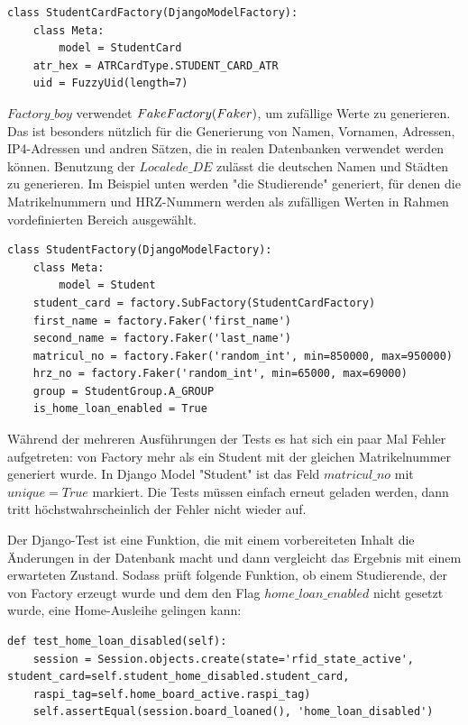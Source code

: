 \begin{lstlisting}[caption={StudentCardFactory},captionpos=b]
class StudentCardFactory(DjangoModelFactory):
	class Meta:
		model = StudentCard
	atr_hex = ATRCardType.STUDENT_CARD_ATR
	uid = FuzzyUid(length=7)  
\end{lstlisting}
$Factory\_boy$ verwendet $Fake\-Factory (Faker)$, um zufällige Werte zu generieren. Das ist besonders nützlich für die Generierung von Namen, Vornamen, Adressen, IP4-Adressen und andren Sätzen, die in realen Datenbanken verwendet werden können. Benutzung der $Locale de\_DE$ zulässt die deutschen Namen und Städten zu generieren. Im Beispiel unten werden "die Studierende" generiert, für denen die Matrikelnummern und HRZ-Nummern werden als zufälligen Werten in Rahmen vordefinierten Bereich ausgewählt.   
\begin{lstlisting}[caption={StudentFactory},captionpos=b]
class StudentFactory(DjangoModelFactory):
	class Meta:
		model = Student
	student_card = factory.SubFactory(StudentCardFactory)
	first_name = factory.Faker('first_name')
	second_name = factory.Faker('last_name')
	matricul_no = factory.Faker('random_int', min=850000, max=950000)
	hrz_no = factory.Faker('random_int', min=65000, max=69000)
	group = StudentGroup.A_GROUP
	is_home_loan_enabled = True
\end{lstlisting}

Während der mehreren Ausführungen der Tests es hat sich ein paar Mal Fehler aufgetreten: von Factory mehr als ein Student mit der gleichen Matrikelnummer generiert wurde. In Django Model "Student" ist das Feld $matricul\_no$ mit $unique=True$ markiert. Die Tests müssen einfach erneut geladen werden, dann tritt höchstwahrscheinlich der Fehler nicht wieder auf. 

Der Django-Test ist eine Funktion, die mit einem vorbereiteten Inhalt die Änderungen in der Datenbank macht und dann vergleicht das Ergebnis mit einem erwarteten Zustand. Sodass prüft folgende Funktion, ob einem Studierende, der von Factory erzeugt wurde und dem den Flag $home\_loan\_enabled$ nicht gesetzt wurde, eine Home-Ausleihe gelingen kann: 
\begin{lstlisting}[caption={Test für einen Student},captionpos=b]
def test_home_loan_disabled(self):
	session = Session.objects.create(state='rfid_state_active', student_card=self.student_home_disabled.student_card,
	raspi_tag=self.home_board_active.raspi_tag)
	self.assertEqual(session.board_loaned(), 'home_loan_disabled')
\end{lstlisting}

